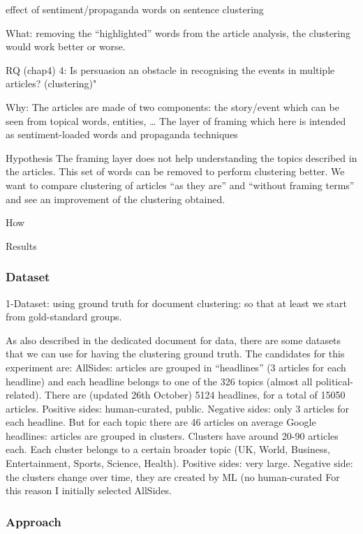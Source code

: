 effect of sentiment/propaganda words on sentence clustering

What: removing the “highlighted” words from the article analysis, the clustering would work better or worse.

RQ (chap4) 4: Is persuasion an obstacle in recognising the events in multiple articles? (clustering)"

Why:
The articles are made of two components:
the story/event which can be seen from topical words, entities, …
The layer of framing which here is intended as sentiment-loaded words and propaganda techniques

Hypothesis
The framing layer does not help understanding the topics described in the articles. This set of words can be removed to perform clustering better.
We want to compare clustering of articles “as they are” and “without framing terms” and see an improvement of the clustering obtained.


How

Results

\subsubsection{Dataset}

1-Dataset: using ground truth for document clustering: so that at least we start from gold-standard groups.

As also described in the dedicated document for data, there are some datasets that we can use for having the clustering ground truth. The candidates for this experiment are:
AllSides: articles are grouped in “headlines” (3 articles for each headline) and each headline belongs to one of the 326 topics (almost all political-related). There are (updated 26th October) 5124 headlines, for a total of 15050 articles. Positive sides: human-curated, public. Negative sides: only 3 articles for each headline. But for each topic there are 46 articles on average
Google headlines: articles are grouped in clusters. Clusters have around 20-90 articles each. Each cluster belongs to a certain broader topic (UK, World, Business, Entertainment, Sports, Science, Health). Positive sides: very large. Negative side: the clusters change over time, they are created by ML (no human-curated
For this reason I initially selected AllSides.

\subsubsection{Approach}

